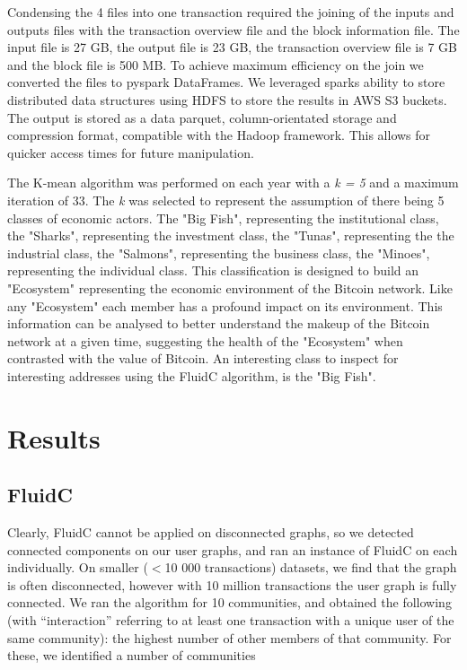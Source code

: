 \documentclass{article}
\begin{document}
Condensing the 4 files into one transaction required the joining of the inputs and outputs files
with the transaction overview file and the block information file. The input file is 27 GB, the output file 
is 23 GB, the transaction overview file is 7 GB and the block file is 500 MB. To achieve maximum efficiency on the join
we converted the files to pyspark DataFrames. We leveraged sparks ability
to store distributed data structures using HDFS to store the results in AWS S3 buckets. The output is
stored as a data parquet, column-orientated storage and compression format, compatible with the Hadoop
framework. This allows for quicker access times for future manipulation.

The K-mean algorithm was performed on each year with a \textit{k = 5} and a maximum iteration of 33.
The \textit{k} was selected to represent the assumption of there being 5 classes of economic actors.
The "Big Fish", representing the institutional class, the "Sharks", representing the investment class, 
the "Tunas", representing the the industrial class, the "Salmons", representing the business class, 
the "Minoes", representing the individual class. This classification is designed to build an
"Ecosystem" representing the economic environment of the Bitcoin network. Like any "Ecosystem"
each member has a profound impact on its environment. This information can be analysed to
better understand the makeup of the Bitcoin network at a given time, suggesting the health
of the "Ecosystem" when contrasted with the value of Bitcoin. An interesting class to inspect 
for interesting addresses using the FluidC algorithm, is the "Big Fish". 

\section{Results}
\subsection{FluidC}
Clearly, FluidC cannot be applied on disconnected graphs, so we detected connected 
components on our user graphs, and ran an instance of FluidC on each individually. 
On smaller ($<$10 000 transactions) datasets, we find that the graph is often disconnected, 
however with 10 million transactions the user graph is fully connected. We ran the algorithm for 
10 communities, and obtained the following 
(with ``interaction'' referring to at least one transaction with a unique user of the same community):
the highest number of other members of that community. For these, we identified a number of communities
\end{document}

